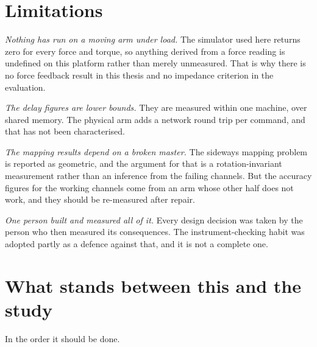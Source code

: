 \section{Limitations}

\emph{Nothing has run on a moving arm under load.} The simulator used here
returns zero for every force and torque, so anything derived from a force
reading is undefined on this platform rather than merely unmeasured. That is
why there is no force feedback result in this thesis and no impedance
criterion in the evaluation.

\emph{The delay figures are lower bounds.} They are measured within one
machine, over shared memory. The physical arm adds a network round trip per
command, and that has not been characterised.

\emph{The mapping results depend on a broken master.} The sideways mapping
problem is reported as geometric, and the argument for that is a
rotation-invariant measurement rather than an inference from the failing
channels. But the accuracy figures for the working channels come from an arm
whose other half does not work, and they should be re-measured after repair.

\emph{One person built and measured all of it.} Every design decision was
taken by the person who then measured its consequences. The instrument-checking
habit was adopted partly as a defence against that, and it is not a complete
one.

\section{What stands between this and the study}

In the order it should be done.

